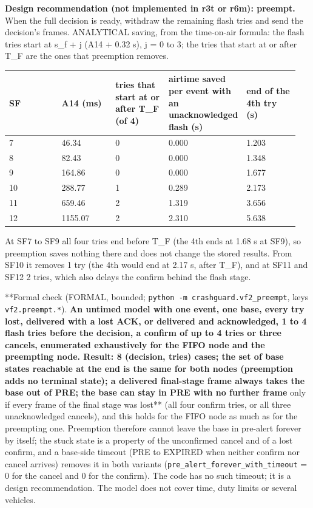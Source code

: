 \textbf{Design recommendation (not implemented in r3t or r6m): preempt.} When the full decision is ready, withdraw the remaining flash tries and send the decision's frames. 
ANALYTICAL saving, from the time-on-air formula: the flash tries start at s\_f + j (A14 + 0.32 s), j = 0 to 3; the tries that start at or after T\_F are the ones that preemption removes.

{\scriptsize\raggedright
\begin{longtable}{p{0.190\linewidth}p{0.190\linewidth}p{0.190\linewidth}p{0.190\linewidth}p{0.190\linewidth}}
\toprule
SF & A14 (ms) & tries that start at or after T\_F (of 4) & airtime saved per event with an unacknowledged flash (s) & end of the 4th try (s) \\
\midrule
\endhead
7 & 46.34 & 0 & 0.000 & 1.203 \\
8 & 82.43 & 0 & 0.000 & 1.348 \\
9 & 164.86 & 0 & 0.000 & 1.677 \\
10 & 288.77 & 1 & 0.289 & 2.173 \\
11 & 659.46 & 2 & 1.319 & 3.656 \\
12 & 1155.07 & 2 & 2.310 & 5.638 \\
\bottomrule
\end{longtable}}

At SF7 to SF9 all four tries end before T\_F (the 4th ends at 1.68 s at SF9), so preemption saves nothing there and does not change the stored results. From SF10 it removes 1 try (the 4th would end at 2.17 s, after T\_F), and at SF11 and SF12 2 tries, which also delays the confirm behind the flash stage.

**Formal check (FORMAL, bounded; \texttt{python -m crashguard.vf2\_preempt}, keys \texttt{vf2.preempt.*}).\textbf{ An untimed model with one event, one base, every try lost, delivered with a lost ACK, or delivered and acknowledged, 1 to 4 flash tries before the decision, a confirm of up to 4 tries or three cancels, enumerated exhaustively for the FIFO node and the preempting node. Result: 8 (decision, tries) cases; the set of base states reachable at the end is the same for both nodes (preemption adds no terminal state); a delivered final-stage frame always takes the base out of PRE; the base can stay in PRE with no further frame }only if every frame of the final stage was lost** (all four confirm tries, or all three unacknowledged cancels), and this holds for the FIFO node as much as for the preempting one. Preemption therefore cannot leave the base in pre-alert forever by itself; the stuck state is a property of the unconfirmed cancel and of a lost confirm, and a base-side timeout (PRE to EXPIRED when neither confirm nor cancel arrives) removes it in both variants (\texttt{pre\_alert\_forever\_with\_timeout} = 0 for the cancel and 0 for the confirm). The code has no such timeout; it is a design recommendation. The model does not cover time, duty limits or several vehicles.

